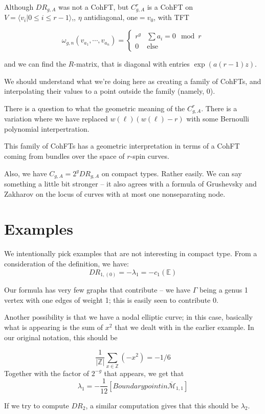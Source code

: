 \documentclass{amsart}
\theoremstyle{definition}
\newcommand{\Z}{\mathbb{Z}}
\newcommand{\one}{\text{one}}
\newcommand{\Mbar}{\overline{\mathcal{M}}}
\begin{document}
Although $DR_{g,A}$ was not a CohFT, but $C^r_{g,A}$ is a CohFT on $V=\langle v_i|0\leq i\leq r-1\rangle$,, $\eta$ antidiagonal, $\one=v_0$, with  TFT

$$\omega_{g,n}(v_{a_1}, \cdots, v_{a_n})=\left\{\begin{array}{ll} r^g & \sum a_i=0\mod r \\ 0 & \text{else}
\end{array}\right.
$$

and we can find the $R$-matrix, that is diagonal with entries $\exp(a(r-1)z)$.

We should understand what we're doing here as creating a family of CohFTs, and interpolating their values to a point outside the family (namely, 0).

There is a question to what the geometric meaning of the $C^r_{g,A}$.  There is a variation where we have replaced $w(\ell)(w(\ell)-r)$ with some Bernoulli polynomial interpertration.

This family of CohFTs has a geometric interpretation in terms of a CohFT coming from bundles over the space of $r$-spin curves.

Also, we have $C_{g,A}=2^g DR_{g,A}$ on compact types.  Rather easily.  We can say something a little bit stronger -- it also agrees with a formula of Grushevsky and Zakharov on the locus of curves with at most one nonseparating node.

\section{Examples }
We intentionally pick examples that are not interesting in compact type.
From a consideration of the definition, we have:
$$DR_{1,(0)}=-\lambda_1=-c_1(\mathbb{E})$$

Our formula has very few graphs that contribute -- we have $\Gamma$ being a genus 1 vertex with one edges of weight 1; this is easily seen to contribute 0.

Another possibility is that we have a nodal elliptic curve; in this case, basically what is appearing is the sum of $x^2$ that we dealt with in the earlier example.  In our original notation, this should be

$$\frac{1}{|\Z|}\sum_{x\in \Z} (-x^2)=-1/6$$
Together with the factor of $2^{-g}$ that appears, we get that $$\lambda_1=-\frac{1}{12}[Boundary point in \Mbar_{1,1}]$$

If we try to compute $DR_2$, a similar computation gives that this should be $\lambda_2$.
\end{document}
